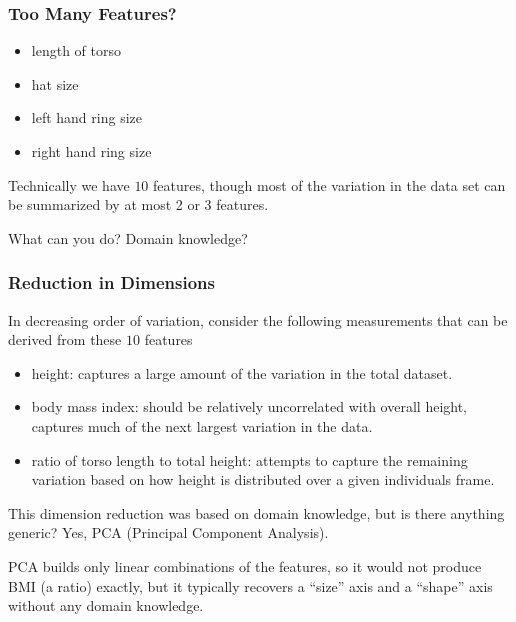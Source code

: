\begin{frame}[fragile] \frametitle{Too Many Features?}
\begin{itemize}
\item length of torso
\item hat size
\item left hand ring size
\item right hand ring size
\end{itemize}
Technically we have $10$ features, though most of the variation
in the data set can be summarized by at most 2 or 3 features.

What can you do? Domain knowledge?
\end{frame}

\begin{frame}[fragile] \frametitle{Reduction in Dimensions} 
In decreasing order of variation, consider the following measurements
that can be derived from these $10$ features
\begin{itemize}
\item height: captures a large amount of the variation in the total
dataset. 
\item body mass index: should be
relatively uncorrelated with overall height, captures much of the
next largest variation in the data. 
\item ratio of torso length to total height: attempts
to capture the remaining variation based on how height is distributed
over a given individuals frame.
\end{itemize}

This dimension reduction was based on domain knowledge, but is there anything generic? Yes, PCA (Principal Component Analysis).

PCA builds only linear combinations of the features, so it would not produce BMI (a ratio) exactly, but it typically recovers a ``size'' axis and a ``shape'' axis without any domain knowledge.

\end{frame}

